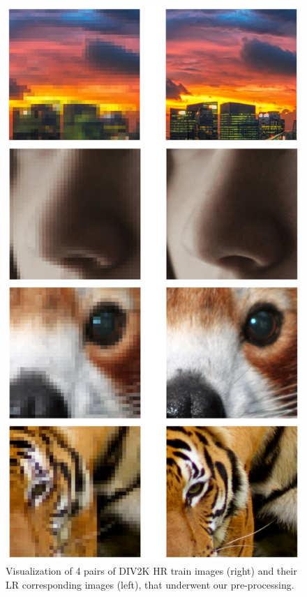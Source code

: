 \documentclass{article}
\begin{document}
{    \begin{figure}[p]
        \centering
        \includegraphics[height=0.9\textheight]{images/DIV2K_HRLR.png}
        \caption{Visualization of 4 pairs of DIV2K HR train images (right) and their LR corresponding images (left), that underwent our pre-processing.}
        \label{fig:div2k-train-pair}
    \end{figure}

}
\end{document}
